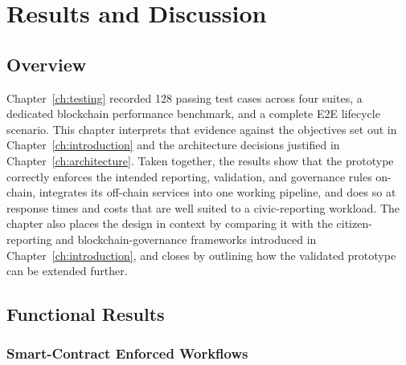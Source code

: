 \chapter{Results and Discussion}
\label{ch:results}

\section{Overview}
\label{sec:results-overview}

Chapter~\ref{ch:testing} recorded 128 passing test cases across four suites, a dedicated blockchain performance benchmark, and a complete \ac{E2E} lifecycle scenario. This chapter interprets that evidence against the objectives set out in Chapter~\ref{ch:introduction} and the architecture decisions justified in Chapter~\ref{ch:architecture}. Taken together, the results show that the prototype correctly enforces the intended reporting, validation, and governance rules on-chain, integrates its off-chain services into one working pipeline, and does so at response times and costs that are well suited to a civic-reporting workload. The chapter also places the design in context by comparing it with the citizen-reporting and blockchain-governance frameworks introduced in Chapter~\ref{ch:introduction}, and closes by outlining how the validated prototype can be extended further.



\section{Functional Results}
\label{sec:functional-results}

\subsection{Smart-Contract Enforced Workflows}

